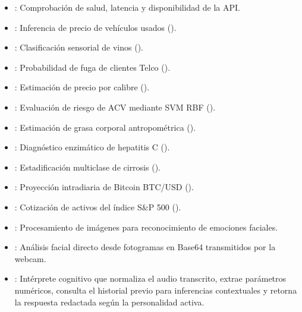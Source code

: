 \documentclass[12pt,letterpaper]{article}
\begin{document}
\begin{itemize}[leftmargin=*]
    \item {}: Comprobación de salud, latencia y disponibilidad de la API.
    \item {}: Inferencia de precio de vehículos usados ().
    \item {}: Clasificación sensorial de vinos ().
    \item {}: Probabilidad de fuga de clientes Telco ().
    \item {}: Estimación de precio por calibre ().
    \item {}: Evaluación de riesgo de ACV mediante SVM RBF ().
    \item {}: Estimación de grasa corporal antropométrica ().
    \item {}: Diagnóstico enzimático de hepatitis C ().
    \item {}: Estadificación multiclase de cirrosis ().
    \item {}: Proyección intradiaria de Bitcoin BTC/USD ().
    \item {}: Cotización de activos del índice S\&P 500 ().
    \item {}: Procesamiento de imágenes para reconocimiento de emociones faciales.
    \item {}: Análisis facial directo desde fotogramas en Base64 transmitidos por la webcam.
    \item {}: Intérprete cognitivo que normaliza el audio transcrito, extrae parámetros numéricos, consulta el historial previo para inferencias contextuales y retorna la respuesta redactada según la personalidad activa.
\end{itemize}
\end{document}
